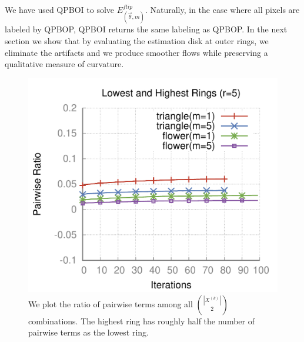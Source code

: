   We have used QPBOI to solve $E_{(\vec{\theta},m)}^{flip}$. Naturally, in the case where all pixels are labeled by QPBOP, QPBOI returns the same labeling as QPBOP. In the next section we show that by evaluating the estimation disk at outer rings, we eliminate the artifacts and we produce smoother flows while preserving a qualitative measure of curvature.
  


\begin{figure}
\center
\includegraphics[scale=0.5]{figures/chapter6/unlabeled-ratio/plots/pairwise-ratio/h0.25/radius-5/plot-pairwiseratio-lowerHigher-concavities-probe.pdf}
\caption{We plot the ratio of pairwise terms among all $\binom{|X^{(k)}|}{2}$ combinations. The highest ring has roughly half the number of pairwise terms as the lowest ring.}
\label{ch6:fig:ratio-pairwise-terms}
\end{figure}


